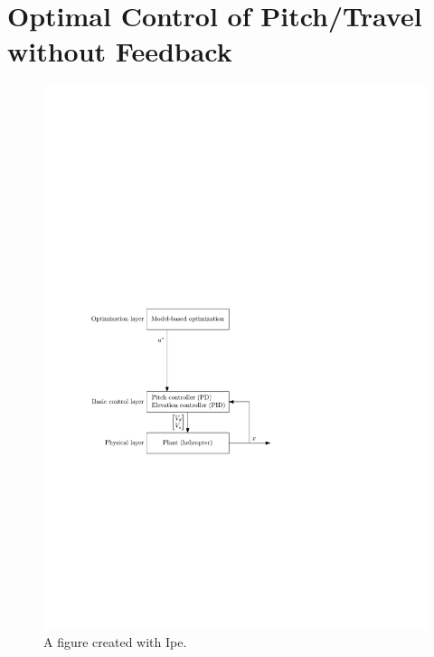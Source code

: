 \section{Optimal Control of Pitch/Travel without Feedback}\label{sec:prob2}

\begin{figure}[hp]
	\centering
		\includegraphics[width=1.00\textwidth]{figures/layers_openloop.pdf}
	\caption{A figure created with Ipe.}
	\label{fig:layers_openloop}
\end{figure}

